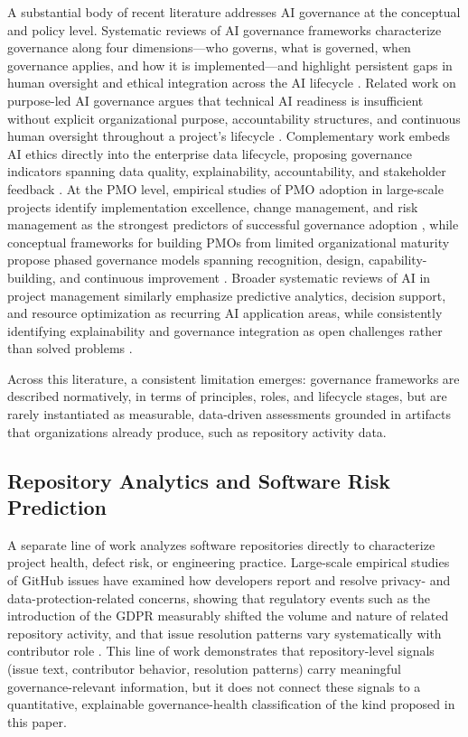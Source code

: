 \documentclass[conference]{IEEEtran}
\begin{document}
A substantial body of recent literature addresses AI governance at the conceptual and
policy level. Systematic reviews of AI governance frameworks characterize governance
along four dimensions---who governs, what is governed, when governance applies, and how
it is implemented---and highlight persistent gaps in human oversight and ethical
integration across the AI lifecycle \cite{ref1}. Related work on purpose-led AI governance
argues that technical AI readiness is insufficient without explicit organizational
purpose, accountability structures, and continuous human oversight throughout a project's
lifecycle \cite{ref2}. Complementary work embeds AI ethics directly into the enterprise
data lifecycle, proposing governance indicators spanning data quality, explainability,
accountability, and stakeholder feedback \cite{ref3}. At the PMO level, empirical studies
of PMO adoption in large-scale projects identify implementation excellence, change
management, and risk management as the strongest predictors of successful governance
adoption \cite{ref4}, while conceptual frameworks for building PMOs from limited
organizational maturity propose phased governance models spanning recognition, design,
capability-building, and continuous improvement \cite{ref5}. Broader systematic reviews of
AI in project management similarly emphasize predictive analytics, decision support, and
resource optimization as recurring AI application areas, while consistently identifying
explainability and governance integration as open challenges rather than solved problems
\cite{ref6,ref7,ref8,ref9}.

Across this literature, a consistent limitation emerges: governance frameworks are
described normatively, in terms of principles, roles, and lifecycle stages, but are
rarely instantiated as measurable, data-driven assessments grounded in artifacts that
organizations already produce, such as repository activity data.

\subsection{Repository Analytics and Software Risk Prediction}

A separate line of work analyzes software repositories directly to characterize project
health, defect risk, or engineering practice. Large-scale empirical studies of GitHub
issues have examined how developers report and resolve privacy- and
data-protection-related concerns, showing that regulatory events such as the introduction
of the GDPR measurably shifted the volume and nature of related repository activity, and
that issue resolution patterns vary systematically with contributor role \cite{ref14}.
This line of work demonstrates that repository-level signals (issue text, contributor
behavior, resolution patterns) carry meaningful governance-relevant information, but it
does not connect these signals to a quantitative, explainable governance-health
classification of the kind proposed in this paper.
\end{document}
